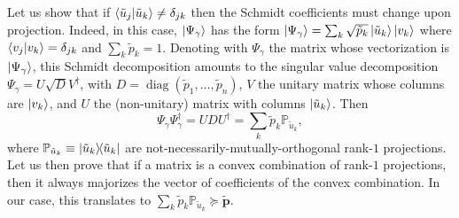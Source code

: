 \documentclass[
	aps, pra,
	superscriptaddress, twocolumn,
	floatfix,
	10pt
]{revtex4-1}
\newcommand{\bs}[1]{\boldsymbol{#1}}
\newcommand{\on}[1]{\operatorname{#1}}
\newcommand{\parTitle}[1]{\noindent{\color{Mahogany}(\emph{#1})}}
\newcommand{\PP}{\mathbb{P}}
\renewcommand{\parTitle}[1]{}
\begin{document}
\parTitle{Entanglement decreases if orthogonality is not preserved}
Let us show that if $\braket{\tilde u_j}{\tilde u_k}\neq\delta_{jk}$ then the Schmidt coefficients must change upon projection.
Indeed, in this case, $\ket{\Psi_\gamma}$ has the form
$\ket{\Psi_\gamma}=\sum_k \sqrt{\tilde p_k} \ket{\tilde u_k}\ket{v_k}$ where $\braket{v_j}{v_k}=\delta_{jk}$ and $\sum_k \tilde p_k=1$.
Denoting with $\Psi_\gamma$ the matrix whose vectorization is $\ket{\Psi_\gamma}$, this Schmidt decomposition amounts to the singular value decomposition $\Psi_\gamma = U\sqrt DV^\dagger$, with $D=\on{diag}(\tilde p_1,...,\tilde p_n)$, $V$ the unitary matrix whose columns are $\ket{v_k}$, and $U$  the (non-unitary) matrix with columns $\ket{\tilde u_k}$.
Then
\begin{equation}
    \Psi_\gamma\Psi_\gamma^\dagger = U D U^\dagger
    = \sum_k \tilde p_k \PP_{\tilde u_k},
\end{equation}
where $\PP_{\tilde u_k}\equiv\ketbra{\tilde u_k}$ are not-necessarily-mutually-orthogonal rank-$1$ projections.
Let us then prove that if a matrix is a convex combination of rank-$1$ projections, then it always majorizes the vector of coefficients of the convex combination.
In our case, this translates to $\sum_k \tilde p_k\PP_{\tilde u_k}\succeq \tilde{\bs{p}}$.
\end{document}
